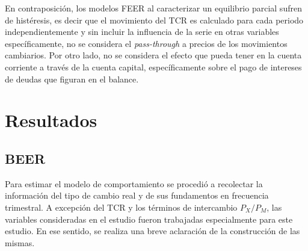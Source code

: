 \documentclass[12pt,letterpaper]{article}
\begin{document}
En contraposición, los modelos FEER al caracterizar un equilibrio parcial sufren de histéresis, es decir que el movimiento del TCR es calculado para cada periodo independientemente y sin incluir la influencia de la serie en otras variables específicamente, no se considera el \emph{pass-through} a precios de los movimientos cambiarios. Por otro lado, no se considera el efecto que pueda tener en la cuenta corriente a través de la cuenta capital, específicamente sobre el pago de intereses de deudas que figuran en el balance.

\section{Resultados}\label{calc}

\subsection*{BEER}
Para estimar el modelo de comportamiento se procedió a recolectar la información del tipo de cambio real y de sus fundamentos en frecuencia trimestral. A excepción del TCR y los términos de intercambio $P_X/P_M$, las variables consideradas en el estudio fueron trabajadas especialmente para este estudio. En ese sentido, se realiza una breve aclaración de la construcción de las mismas. 
\end{document}

